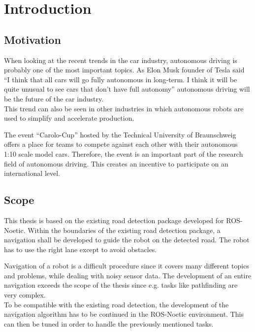 \chapter{Introduction}
\label{introduction}


\section{Motivation}
When looking at the recent trends in the car industry, autonomous driving is probably one of the most important topics. As Elon Musk founder of Tesla said ``I think that all cars will go fully autonomous in long-term. I think it will be quite unusual to see cars that don’t have full autonomy'' autonomous driving will be the future of the car industry\cite{musk}.\\

This trend can also be seen in other industries in which autonomous robots are used to simplify and accelerate production. 

The event ``Carolo-Cup'' hosted by the Technical University of Braunschweig offers a place for teams to compete against each other with their autonomous 1:10 scale model cars. Therefore, the event is an important part of the research field of autonomous driving. This creates an incentive to participate on an international level.

\section{Scope}


This thesis is based on the existing road detection package developed for ROS-Noetic. Within the boundaries of the existing road detection package, a navigation shall be developed to guide the robot on the detected road. The robot has to use the right lane except to avoid obstacles.

Navigation of a robot is a difficult procedure since it covers many different topics and problems, while dealing with noisy sensor data. The development of an entire navigation exceeds the scope of the thesis since e.g. tasks like pathfinding are very complex.\\

To be compatible with the existing road detection, the development of the navigation algorithm has to be continued in the ROS-Noetic environment. This can then be tuned in order to handle the previously mentioned tasks.\\

